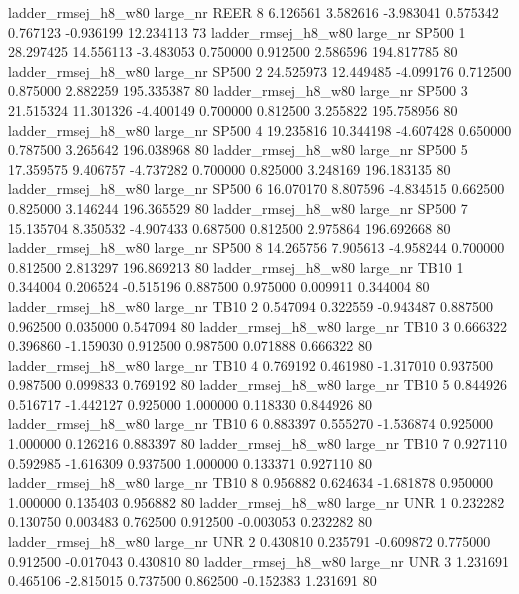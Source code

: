 ladder_rmsej_h8_w80   large_nr     REER                 8  6.126561  3.582616  -3.983041 0.575342 0.767123 -0.936199   12.234113 73
ladder_rmsej_h8_w80   large_nr    SP500                 1 28.297425 14.556113  -3.483053 0.750000 0.912500  2.586596  194.817785 80
ladder_rmsej_h8_w80   large_nr    SP500                 2 24.525973 12.449485  -4.099176 0.712500 0.875000  2.882259  195.335387 80
ladder_rmsej_h8_w80   large_nr    SP500                 3 21.515324 11.301326  -4.400149 0.700000 0.812500  3.255822  195.758956 80
ladder_rmsej_h8_w80   large_nr    SP500                 4 19.235816 10.344198  -4.607428 0.650000 0.787500  3.265642  196.038968 80
ladder_rmsej_h8_w80   large_nr    SP500                 5 17.359575  9.406757  -4.737282 0.700000 0.825000  3.248169  196.183135 80
ladder_rmsej_h8_w80   large_nr    SP500                 6 16.070170  8.807596  -4.834515 0.662500 0.825000  3.146244  196.365529 80
ladder_rmsej_h8_w80   large_nr    SP500                 7 15.135704  8.350532  -4.907433 0.687500 0.812500  2.975864  196.692668 80
ladder_rmsej_h8_w80   large_nr    SP500                 8 14.265756  7.905613  -4.958244 0.700000 0.812500  2.813297  196.869213 80
ladder_rmsej_h8_w80   large_nr     TB10                 1  0.344004  0.206524  -0.515196 0.887500 0.975000  0.009911    0.344004 80
ladder_rmsej_h8_w80   large_nr     TB10                 2  0.547094  0.322559  -0.943487 0.887500 0.962500  0.035000    0.547094 80
ladder_rmsej_h8_w80   large_nr     TB10                 3  0.666322  0.396860  -1.159030 0.912500 0.987500  0.071888    0.666322 80
ladder_rmsej_h8_w80   large_nr     TB10                 4  0.769192  0.461980  -1.317010 0.937500 0.987500  0.099833    0.769192 80
ladder_rmsej_h8_w80   large_nr     TB10                 5  0.844926  0.516717  -1.442127 0.925000 1.000000  0.118330    0.844926 80
ladder_rmsej_h8_w80   large_nr     TB10                 6  0.883397  0.555270  -1.536874 0.925000 1.000000  0.126216    0.883397 80
ladder_rmsej_h8_w80   large_nr     TB10                 7  0.927110  0.592985  -1.616309 0.937500 1.000000  0.133371    0.927110 80
ladder_rmsej_h8_w80   large_nr     TB10                 8  0.956882  0.624634  -1.681878 0.950000 1.000000  0.135403    0.956882 80
ladder_rmsej_h8_w80   large_nr      UNR                 1  0.232282  0.130750   0.003483 0.762500 0.912500 -0.003053    0.232282 80
ladder_rmsej_h8_w80   large_nr      UNR                 2  0.430810  0.235791  -0.609872 0.775000 0.912500 -0.017043    0.430810 80
ladder_rmsej_h8_w80   large_nr      UNR                 3  1.231691  0.465106  -2.815015 0.737500 0.862500 -0.152383    1.231691 80
